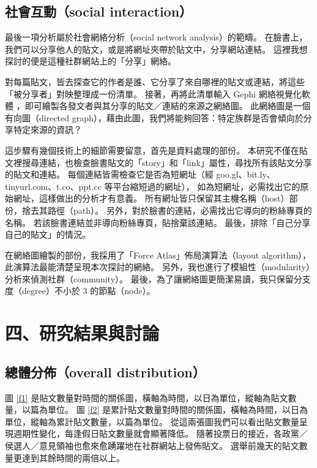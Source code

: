 \documentclass[a4paper, 10pt, conference]{ieeeconf}       %
\begin{document}
\begin{CJK}{UTF8}{bsmi}
\subsection*{社會互動（social interaction）}

最後一項分析屬於社會網絡分析（social network analysis）的範疇。%
在臉書上，我們可以分享他人的貼文，或是將網址夾帶於貼文中，分享網站連結。%
這裡我想探討的便是這種社群網站上的「分享」網絡。%

對每篇貼文，皆去探查它的作者是誰、它分享了來自哪裡的貼文或連結，將這些「被分享者」對映整理成一份清單。%
接著，再將此清單輸入 Gephi 網絡視覺化軟體 \cite{c15}，即可繪製各發文者與其分享的貼文／連結的來源之網絡圖。%
此網絡圖是一個有向圖（directed graph），藉由此圖，我們將能夠回答：特定族群是否會傾向於分享特定來源的資訊？%

這步驟有幾個技術上的細節需要留意，首先是資料處理的部份。%
本研究不僅在貼文裡搜尋連結，也檢查臉書貼文的「story」和「link」屬性，尋找所有該貼文分享的貼文和連結。%
每個連結皆需檢查它是否為短網址（經 goo.gl、bit.ly、tinyurl.com、t.co、ppt.cc 等平台縮短過的網址），%
如為短網址，必需找出它的原始網址，這樣做出的分析才有意義。%
所有網址皆只保留其主機名稱（host）部份，捨去其路徑（path）。%
另外，對於臉書的連結，必需找出它導向的粉絲專頁的名稱。%
若該臉書連結並非導向粉絲專頁，貼捨棄該連結。%
最後，排除「自己分享自己的貼文」的情況。%

在網絡圖繪製的部份，我採用了「Force Atlas」佈局演算法（layout algorithm），此演算法最能清楚呈現本次探討的網絡。%
另外，我也進行了模組性（modularity）分析來偵測社群（community）。%
最後，為了讓網絡圖更簡潔易讀，我只保留分支度（degree）不小於 3 的節點（node）。%

\section*{四、研究結果與討論}

\subsection*{總體分佈（overall distribution）}

圖 \ref{f1} 是貼文數量對時間的關係圖，橫軸為時間，以日為單位，縱軸為貼文數量，以篇為單位。%
圖 \ref{f2} 是累計貼文數量對時間的關係圖，橫軸為時間，以日為單位，縱軸為累計貼文數量，以篇為單位。%
從這兩張圖我們可以看出貼文數量呈現週期性變化，每逢假日貼文數量就會顯著降低。%
隨著投票日的接近，各政黨／侯選人／意見領袖也愈來愈踴躍地在社群網站上發佈貼文。%
選舉前幾天的貼文數量更達到其餘時間的兩倍以上。%


\end{CJK}
\end{document}
